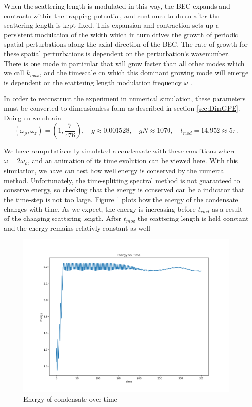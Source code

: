 \documentclass[12]{article}
\begin{document}
When the scattering length is modulated in this way, the BEC expands and contracts within the trapping potential, and continues to do so after the scattering length is kept fixed. This expansion and contraction sets up a persistent modulation of the width which in turn drives the growth of periodic spatial perturbations along the axial direction of the BEC. The rate of growth for these spatial perturbations is dependent on the perturbation's wavenumber. There is one mode in particular that will grow faster than all other modes which we call $k_{max}$, and the timescale on which this dominant growing mode will emerge is dependent on the scattering length modulation frequency $\omega$ \cite{mustafa}. 

In order to reconstruct the experiment in numerical simulation, these parameters must be converted to dimensionless form as described in section \ref{sec:DimGPE}. Doing so we obtain
\begin{equation}
\left(\omega_\rho, \omega_z\right)=(1 , \textstyle\frac{7}{476}), \quad g \approx 0.001528, \quad gN \approx 1070, \quad t_{mod} = 14.952 \approx 5\pi.
\end{equation}

We have computationally simulated a condensate with these conditions where $\omega = 2\omega_\rho$, and an animation of its time evolution can be viewed \href{}{here}. With this simulation, we have can test how well energy is conserved by the numercal method. Unfortunately, the time-splitting spectral method is not guaranteed to conserve energy, so checking that the energy is conserved can be a indicator that the time-step is not too large. Figure \ref{fig:energy} plots how the energy of the condensate changes with time. As we expect, the energy is increasing before $t_{mod}$ as a result of the changing scattering length. After $t_{mod}$ the scattering length is held constant and the energy remains relativly constant as well.

\begin{figure}
\centering
\includegraphics[width=\textwidth]{energyPlot}
\caption{Energy of condensate over time}
\label{fig:energy}
\end{figure}
\end{document}
